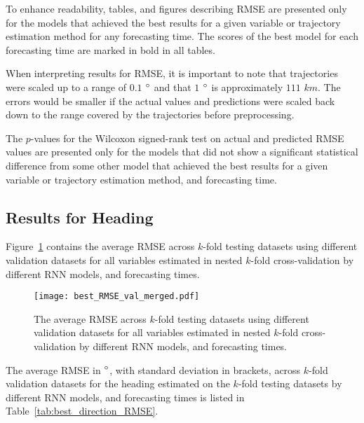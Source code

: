 \documentclass[preprint,12pt]{elsarticle}
\begin{document}
To enhance readability, tables, and figures describing RMSE are presented only for the models that achieved the best results for a given variable or trajectory estimation method for any forecasting time. The scores of the best model for each forecasting time are marked in bold in all tables.

When interpreting results for RMSE, it is important to note that trajectories were scaled up to a range of $0.1$ $\degree$ and that $1$ $\degree$ is approximately $111$ $km$. The errors would be smaller if the actual values and predictions were scaled back down to the range covered by the trajectories before preprocessing.

The $p$-values for the Wilcoxon signed-rank test on actual and predicted RMSE values are presented only for the models that did not show a significant statistical difference from some other model that achieved the best results for a given variable or trajectory estimation method, and forecasting time.

\subsection{Results for Heading}

Figure~\ref{fig:best_RMSE_val_merged} contains the average RMSE across $k$-fold testing datasets using different validation datasets for all variables estimated in nested $k$-fold cross-validation by different RNN models, and forecasting times.

\begin{figure}[!ht]
	\centering
	\texttt{[image: best\_RMSE\_val\_merged.pdf]}
	\caption{The average RMSE across $k$-fold testing datasets using different validation datasets for all variables estimated in nested $k$-fold cross-validation by different RNN models, and forecasting times.}
	\label{fig:best_RMSE_val_merged}
\end{figure}

The average RMSE in $\degree$, with standard deviation in brackets, across $k$-fold validation datasets for the heading estimated on the $k$-fold testing datasets by different RNN models, and forecasting times is listed in Table~\ref{tab:best_direction_RMSE}.
\end{document}
